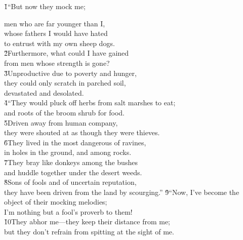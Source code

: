 \v{1}``But now they mock me;

\begin{poetry}
\poemll    men who are far younger than I, \\
\poeml whose fathers I would have hated \\
\poemll    to entrust with my own sheep dogs. \\
\poeml \v{2}Furthermore, what could I have gained \\
\poemll    from men whose strength is gone? \\
\poeml \v{3}Unproductive due to poverty and hunger, \\
\poemll    they could only scratch in parched soil, \\
\poemlll       devastated and desolated. \\
\poeml \v{4}``They would pluck off herbs from salt marshes to eat; \\
\poemll    and roots of the broom shrub for food. \\
\poeml \v{5}Driven away from human company, \\
\poemll    they were shouted at as though they were thieves. \\
\poeml \v{6}They lived in the most dangerous of ravines, \\
\poemll    in holes in the ground, and among rocks. \\
\poeml \v{7}They bray like donkeys among the bushes \\
\poemll    and huddle together under the desert weeds. \\
\poeml \v{8}Sons of fools and of uncertain reputation, \\
\poemll    they have been driven from the land by scourging.''
\poeml \v{9}``Now, I've become the object of their mocking melodies; \\
\poemll    I'm nothing but a fool's proverb to them! \\
\poeml \v{10}They abhor me---they keep their distance from me; \\
\poemll    but they don't refrain from spitting at the sight of me. \\

\end{poetry}
